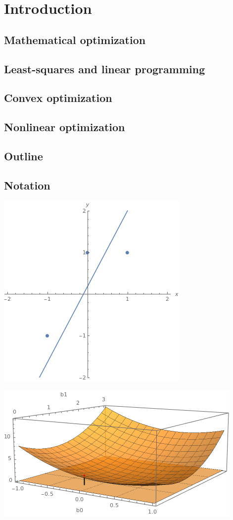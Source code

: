 \chapter{Introduction}

\clearpage
\section{Mathematical optimization}

\clearpage
\section{Least-squares and linear programming}

\clearpage
\section{Convex optimization}

\clearpage
\section{Nonlinear optimization}

\clearpage
\section{Outline}

\clearpage
\section{Notation}


\clearpage
\hfil\includegraphics[width=.5\textwidth]{../Graphics/01-ML01.png}\hfil

\clearpage
\hfil\includegraphics[width=.5\textwidth]{../Graphics/01-ML02.png}\hfil


